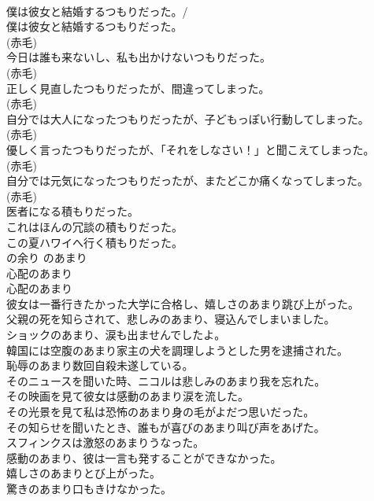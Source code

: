 \documentclass[8pt]{extreport}
\begin{document}
\begin{CJK}{UTF8}{min}
\\	僕は彼女と結婚するつもりだった。/ 
\\	僕は彼女と結婚するつもりだった。  
\\	(赤毛)
\\	今日は誰も来ないし、私も出かけないつもりだった。  
\\	(赤毛)
\\	正しく見直したつもりだったが、間違ってしまった。  
\\	(赤毛)
\\	自分では大人になったつもりだったが、子どもっぽい行動してしまった。  
\\	(赤毛)
\\	優しく言ったつもりだったが、「それをしなさい！」と聞こえてしまった。  
\\	(赤毛)
\\	自分では元気になったつもりだったが、またどこか痛くなってしまった。  
\\	(赤毛)
\\	医者になる積もりだった。   
\\	これはほんの冗談の積もりだった。   
\\	この夏ハワイへ行く積もりだった。   
\\	の余り	のあまり	
\\	心配のあまり 
\\	心配のあまり  
\\	彼女は一番行きたかった大学に合格し、嬉しさのあまり跳び上がった。  
\\	父親の死を知らされて、悲しみのあまり、寝込んでしまいました。  
\\	ショックのあまり、涙も出ませんでしたよ。  
\\	韓国には空腹のあまり家主の犬を調理しようとした男を逮捕された。  
\\	恥辱のあまり数回自殺未遂している。  
\\	そのニュースを聞いた時、ニコルは悲しみのあまり我を忘れた。   
\\	その映画を見て彼女は感動のあまり涙を流した。   
\\	その光景を見て私は恐怖のあまり身の毛がよだつ思いだった。   
\\	その知らせを聞いたとき、誰もが喜びのあまり叫び声をあげた。   
\\	スフィンクスは激怒のあまりうなった。   
\\	感動のあまり、彼は一言も発することができなかった。   
\\	嬉しさのあまりとび上がった。  
\\	驚きのあまり口もきけなかった。   

\end{CJK}
\end{document}
